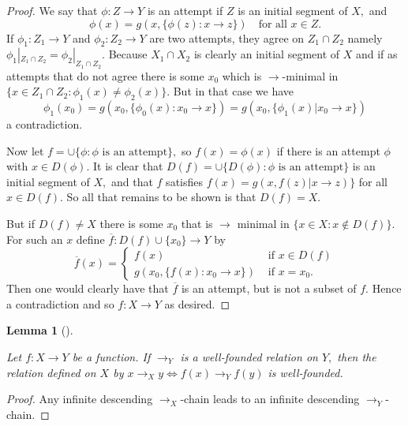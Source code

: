 \documentclass[
  letterpaper,
  10pt,
  reqno,
  twopage,
  openany]{book}
\theoremstyle{plain}
\newtheorem{lemma}{Lemma}[chapter]
\theoremstyle{definition}
\theoremstyle{definition}
\theoremstyle{definition}
\theoremstyle{plain}
\theoremstyle{plain}
\theoremstyle{remark}
\begin{document}
\begin{proof}

We say that \(\phi:Z\to Y\) is an attempt if \(Z\) is an initial segment
of \(X,\) and \[
\phi(x)=g(x,\{\phi(z):x \longrightarrow z\}) \quad \text{for all $x\in Z.$}
\] If \(\phi_1:Z_1\to Y\) and \(\phi_2: Z_2\to Y\) are two attempts,
they agree on \(Z_1\cap Z_2\) namely
\(\phi_1|_{Z_1 \cap Z_2}=\phi_2|_{Z_1 \cap Z_2}.\) Because
\(X_1\cap X_2\) is clearly an initial segment of \(X\) and if as
attempts that do not agree there is some \(x_0\) which is
\(\longrightarrow\)-minimal in
\(\{x\in Z_1 \cap Z_2 : \phi_1(x)\neq \phi_2(x)\}.\) But in that case we
have \[
\phi_1(x_0)
=g(x_0,\{\phi_0(x) : x_0\longrightarrow x\})
=g(x_0, \{\phi_1(x) | x_0\longrightarrow x\})
\] a contradiction.

Now let \(f=\cup \{\phi : \phi \text{ is an attempt}\},\) so
\(f(x)=\phi(x)\) if there is an attempt \(\phi\) with \(x\in D(\phi).\)
It is clear that \(D(f)=\cup \{D(\phi) : \phi \text{ is an attempt} \}\)
is an initial segment of \(X,\) and that \(f\) satisfies
\(f(x)=g(x,f(z)|x \longrightarrow z)\}\) for all \(x\in D(f).\) So all
that remains to be shown is that \(D(f)=X.\)

But if \(D(f)\neq X\) there is some \(x_0\) that is \(\longrightarrow\)
minimal in \(\{x\in X : x\not\in D(f)\}.\) For such an \(x\) define
\(\overline{f}:D(f)\cup \{x_0\}\to Y\) by \[
\overline{f}(x)=
\begin{cases}
f(x) & \text{ if } x\in D(f) \\
g(x_0,\{f(x) : x_0 \longrightarrow x\}) & \text{ if } x=x_0.
\end{cases}
\] Then one would clearly have that \(\overline{f}\) is an attempt, but
is not a subset of \(f.\) Hence a contradiction and so \(f:X\to Y\) as
desired.

\end{proof}

\leavevmode{}%
\begin{lemma}[]\label{lem-infinite-descending}

Let \(f:X\to Y\) be a function. If \(\longrightarrow_Y\) is a
well-founded relation on \(Y,\) then the relation defined on \(X\) by
\(x \longrightarrow_X y \Leftrightarrow f(x)\longrightarrow_Y f(y)\) is
well-founded.

\end{lemma}

\begin{proof}

Any infinite descending \(\longrightarrow_X\)-chain leads to an infinite
descending \(\longrightarrow_Y\)-chain.

\end{proof}
\end{document}
